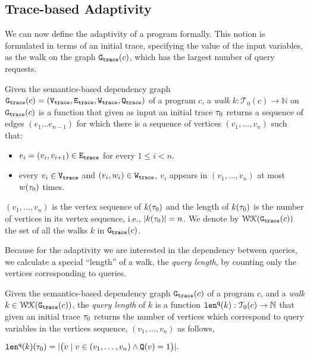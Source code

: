 \subsection{Trace-based Adaptivity}
We can now define the adaptivity of a program formally. This notion is formulated in terms of an initial trace, specifying the value of the input variables, as the walk on the graph $\mathtt{{G_{trace}}}({c})$, which has the largest number of query requests.


\begin{defn}
\label{def:finitewalk}
Given the semantics-based dependency graph $\mathtt{{G_{trace}}}({c}) = (\mathtt{{V_{trace}}}, \mathtt{{E_{trace}}}, \mathtt{{W_{trace}}}, \mathtt{{Q_{trace}}})$ of a program $c$, a \emph{walk} $k:\mathcal{T}_0(c)\to \mathbb{N}$ on $\mathtt{{G_{trace}}}({c})$ is a function that given as input an initial trace $\mathtt{\tau}_0$ returns a sequence of edges $(e_1 \ldots e_{n - 1})$ 
for which there is a sequence of vertices $(v_1, \ldots, v_{n})$ such that:
\begin{itemize}
\item $e_i = (v_{i},v_{i + 1}) \in \mathtt{{E_{trace}}}$ for every $1 \leq i < n$.
\item every $v_i \in \mathtt{{V_{trace}}}$ and $(v_i, w_i) \in \mathtt{{W_{trace}}}$, $v_i$ appears in $(v_1, \ldots, v_{n})$ at most $w(\mathtt{\tau}_0)$ times.  
\end{itemize}
{$(v_1, \ldots, v_{n})$ is the vertex sequence of $k(\mathtt{\tau}_0)$ and the length of $k(\mathtt{\tau}_0)$ is the number of vertices in its vertex sequence, i.e., $|k(\mathtt{\tau}_0)| = n$.}
We denote by $\mathcal{WK}(\mathtt{{G_{trace}}}(c))$
the set of all the  walks $k$ in $\mathtt{{G_{trace}}}(c)$.
\end{defn} 
Because for the adaptivity
we are interested in the dependency between queries,
we calculate a special ``length'' of a walk, the \emph{query length},  by counting only the vertices
corresponding to queries.
\begin{defn}
\label{def:qlen}
Given 
the semantics-based dependency graph $\mathtt{{G_{trace}}}({c})$ of a program $c$,
 and a \emph{walk} 
 $k \in \mathcal{WK}(\mathtt{{G_{trace}}}(c))$, the \emph{query length} of $k$ is a function $\mathtt{len}^{\tt q}(k):\mathcal{T}_0(c) \to \mathbb{N}$ that given an initial trace $\mathtt{\tau}_0$ returns
the number of vertices which correspond to query variables in the vertices sequence, $(v_1, \ldots, v_{n})$ as follows, 
\begin{center}
   $
  \mathtt{len}^{\tt q}(k)(\mathtt{\tau}_0) = |\big( v \mid v \in (v_1, \ldots, v_{n}) \land \mathtt{Q}(v) = 1 \big)|.
$
\end{center}
\end{defn}
